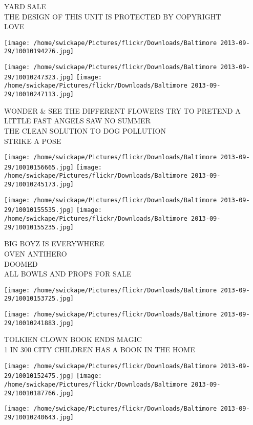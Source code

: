 \documentclass[10pt,letterpaper]{article}
\begin{document}
YARD SALE\\
THE DESIGN OF THIS UNIT IS PROTECTED BY COPYRIGHT\\
LOVE
\pagebreak

\texttt{[image: /home/swickape/Pictures/flickr/Downloads/Baltimore 2013-09-29/10010194276.jpg]}

\vspace{0.25in}
\texttt{[image: /home/swickape/Pictures/flickr/Downloads/Baltimore 2013-09-29/10010247323.jpg]}
\texttt{[image: /home/swickape/Pictures/flickr/Downloads/Baltimore 2013-09-29/10010247113.jpg]}

WONDER \& SEE THE DIFFERENT FLOWERS TRY TO PRETEND A LITTLE FAST ANGELS SAW NO SUMMER\\
THE CLEAN SOLUTION TO DOG POLLUTION\\
STRIKE A POSE
\pagebreak

\texttt{[image: /home/swickape/Pictures/flickr/Downloads/Baltimore 2013-09-29/10010156665.jpg]}
\texttt{[image: /home/swickape/Pictures/flickr/Downloads/Baltimore 2013-09-29/10010245173.jpg]}

\texttt{[image: /home/swickape/Pictures/flickr/Downloads/Baltimore 2013-09-29/10010155535.jpg]}
\texttt{[image: /home/swickape/Pictures/flickr/Downloads/Baltimore 2013-09-29/10010155235.jpg]}

BIG BOYZ IS EVERYWHERE\\
OVEN ANTIHERO\\
DOOMED\\
ALL BOWLS AND PROPS FOR SALE
\pagebreak

\texttt{[image: /home/swickape/Pictures/flickr/Downloads/Baltimore 2013-09-29/10010153725.jpg]}

\vspace{0.25in}
\texttt{[image: /home/swickape/Pictures/flickr/Downloads/Baltimore 2013-09-29/10010241883.jpg]}

TOLKIEN CLOWN BOOK ENDS MAGIC\\
1 IN 300 CITY CHILDREN HAS A BOOK IN THE HOME
\pagebreak

\texttt{[image: /home/swickape/Pictures/flickr/Downloads/Baltimore 2013-09-29/10010152475.jpg]}
\texttt{[image: /home/swickape/Pictures/flickr/Downloads/Baltimore 2013-09-29/10010187766.jpg]}

\texttt{[image: /home/swickape/Pictures/flickr/Downloads/Baltimore 2013-09-29/10010240643.jpg]}
\end{document}
